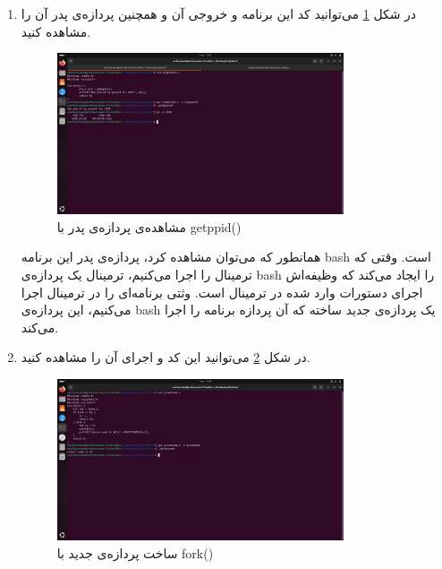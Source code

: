 \documentclass[12pt]{article}
\begin{document}
        \begin{enumerate}
        \item 
        در شکل 
        \ref{im4}
        می‌توانید کد این برنامه و خروجی آن و همچنین پردازه‌ی پدر آن را مشاهده کنید.

        \begin{figure}[H]
		\centering
		\includegraphics[width=0.8\textwidth]{report4-resources/4.png}
		\caption{مشاهده‌ی پردازه‌ی پدر با \textenglish{getppid()}}
            \label{im4}
	\end{figure}

        همانطور که می‌توان مشاهده کرد، پردازه‌ی پدر این برنامه 
        \textenglish{bash}
        است. وقتی که ترمینال را اجرا می‌کنیم، ترمینال یک پردازه‌ی
        \textenglish{bash}
        را ایجاد می‌کند که وظیفه‌اش اجرای دستورات وارد شده در ترمینال است. وثتی برنامه‌ای را در ترمینال اجرا می‌کنیم، این پردازه‌ی
        \textenglish{bash}
        یک پردازه‌ی جدید ساخته که آن پردازه برنامه را اجرا می‌کند.

        \item 
        در شکل 
        \ref{im5}
        می‌توانید این کد و اجرای آن را مشاهده کنید.

        \begin{figure}[H]
		\centering
		\includegraphics[width=0.8\textwidth]{report4-resources/5.png}
		\caption{ساخت پردازه‌ی جدید با \textenglish{fork()}}
            \label{im5}
	\end{figure}


\end{enumerate}
\end{document}
